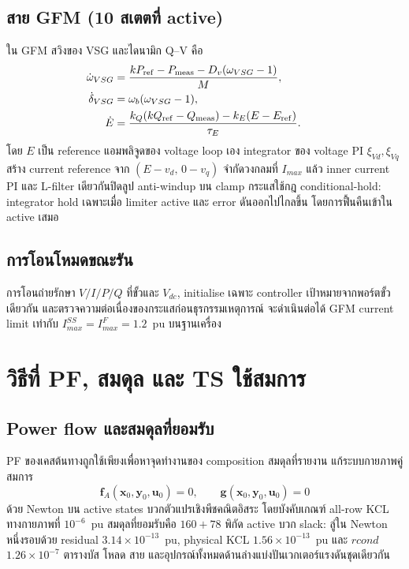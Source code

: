 \documentclass[12pt,a4paper]{article}
\newcommand{\vect}[1]{\boldsymbol{#1}}
\begin{document}
\subsection{สาย GFM (10 สเตตที่ active)}

ใน GFM สวิงของ VSG และไดนามิก Q--V คือ
\begin{align}
\dot\omega_{VSG}&=\frac{k P_{\rm ref}-P_{\rm meas}-D_v(\omega_{VSG}-1)}{M},\\
\dot\delta_{VSG}&=\omega_b(\omega_{VSG}-1),\\
\dot E&=\frac{k_Q(k Q_{\rm ref}-Q_{\rm meas})-k_E(E-E_{\rm ref})}{\tau_E}.&&
\end{align}
โดย $E$ เป็น reference แอมพลิจูดของ voltage loop เอง integrator ของ voltage PI
$\xi_{Vd},\xi_{Vq}$ สร้าง current reference จาก $(E-v_d,\,0-v_q)$
จำกัดวงกลมที่ $I_{max}$ แล้ว inner current PI และ L-filter เดียวกันปิดลูป
anti-windup บน clamp กระแสใช้กฎ conditional-hold: integrator hold เฉพาะเมื่อ
limiter active และ error ดันออกไปไกลขึ้น โดยการฟื้นคืนเข้าใน active เสมอ

\subsection{การโอนโหมดขณะรัน}

การโอนถ่ายรักษา $V/I/P/Q$ ที่ขั้วและ $V_{dc}$, initialise เฉพาะ controller
เป้าหมายจากพอร์ตขั้วเดียวกัน และตรวจความต่อเนื่องของกระแสก่อนธุรกรรมเหตุการณ์
จะดำเนินต่อได้ GFM current limit เท่ากับ $I_{max}^{SS}=I_{max}^{F}=1.2$~pu
บนฐานเครื่อง

\section{วิธีที่ PF, สมดุล และ TS ใช้สมการ}\label{sec:tsform}

\subsection{Power flow และสมดุลที่ยอมรับ}

PF ของเคสต้นทางถูกใช้เพียงเพื่อหาจุดทำงานของ composition สมดุลที่รายงาน
แก้ระบบกายภาพคู่สมการ
\[
\vect f_A(\vect x_0,\vect y_0,\vect u_0)=0,\qquad
\vect g(\vect x_0,\vect y_0,\vect u_0)=0
\]
ด้วย Newton บน active states บวกตัวแปรเชิงพีชคณิตอิสระ โดยบังคับเกณฑ์
all-row KCL ทางกายภาพที่ $10^{-6}$~pu สมดุลที่ยอมรับคือ $160+78$ พิกัด active
บวก slack: ลู่ใน Newton หนึ่งรอบด้วย residual $3.14\times10^{-13}$~pu,
physical KCL $1.56\times10^{-13}$~pu และ $rcond$ $1.26\times10^{-7}$
ตารางบัส โหลด สาย และอุปกรณ์ทั้งหมดด้านล่างแบ่งปันเวกเตอร์แรงดันชุดเดียวกัน
\end{document}
